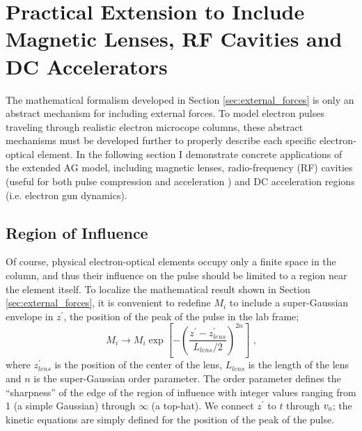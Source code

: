 
\section{Practical Extension to Include Magnetic Lenses, RF Cavities and DC Accelerators}

The mathematical formalism developed in Section \ref{sec:external_forces} is only an abstract mechanism for including external forces.
To model electron pulses traveling through realistic electron microcope columns, these abstract mechanisms must be developed further to properly describe each specific electron-optical element.
In the following section I demonstrate concrete applications of the extended AG model, including magnetic lenses, radio-frequency (RF) cavities (useful for both pulse compression and acceleration %
) and DC acceleration regions (i.e. electron gun dynamics).

\subsection{Region of Influence}

Of course, physical electron-optical elements occupy only a finite space in the column, and thus their influence on the pulse should be limited to a region near the element itself.
To localize the mathematical result shown in Section \ref{sec:external_forces}, it is convenient to redefine $M_{i}$ to include a super-Gaussian envelope in $z^{\prime}$, the position of the peak of the pulse in the lab frame;
\begin{equation} \label{eq:reg_of_influence}
  M_{i}	\to M_{i} \exp \left [ - \left (  \frac{ z^{\prime} - z_{lens}^{\prime} }{ L_{lens} / 2 } \right )^{ 2 n } \right ] \text{ ,}
\end{equation}
where $z_{lens}^{\prime}$ is the position of the center of the lens, $L_{lens}$ is the length of the lens and $n$ is the super-Gaussian order parameter.
The order parameter defines the ``sharpness'' of the edge of the region of influence with integer values ranging from 1 (a simple Gaussian) through $\infty$ (a top-hat).
We connect $z^{\prime}$ to $t$ through $ v_{{\scriptscriptstyle 0}} $; the kinetic equations are simply defined for the position of the peak of the pulse.

